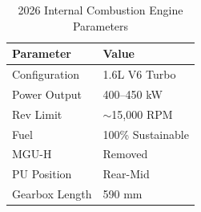 \begin{table}[H]
\centering
\caption{2026 Internal Combustion Engine Parameters}
\vspace{0.2cm}
\begin{tabularx}{\textwidth}{@{}XX@{}}
\toprule
\textbf{Parameter} & \textbf{Value} \\
\midrule
Configuration & 1.6L V6 Turbo \\
Power Output & 400--450 kW \\
Rev Limit & $\sim$15,000 RPM \\
Fuel & 100\% Sustainable \\
MGU-H & Removed \\
PU Position & Rear-Mid \\
Gearbox Length & 590 mm \\
\bottomrule
\end{tabularx}
\label{tab:ice_params}
\end{table}

